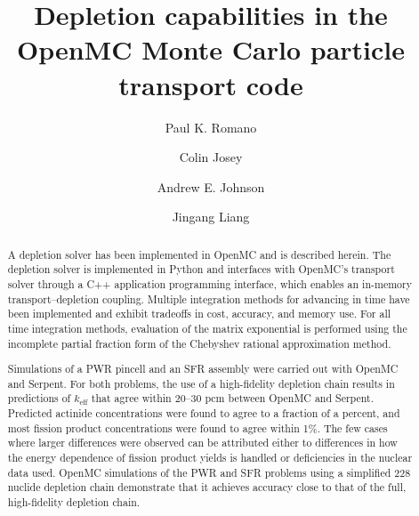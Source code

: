 \documentclass[3p,authoryear]{elsarticle}
\begin{document}
\title{Depletion capabilities in the OpenMC Monte Carlo particle transport code}

\author[anl]{Paul K. Romano}

\author[lanl]{Colin Josey}

\author[gatech]{Andrew E. Johnson}

\author[tsinghua]{Jingang Liang}

\address[anl]{Argonne National Laboratory, 9700 S. Cass Ave, Lemont, IL 60439, United States}
\address[lanl]{Los Alamos National Laboratory, P.O. Box 1663, Los Alamos, NM 87545, United States}
\address[gatech]{Georgia Institute of Technology, 770 State St NW, Atlanta, GA 30318, United States}
\address[tsinghua]{Institute of Nuclear and New Energy Technology, Tsinghua University, Beijing, China}

\begin{abstract}
  A depletion solver has been implemented in OpenMC and is described herein. The
  depletion solver is implemented in Python and interfaces with OpenMC's
  transport solver through a C++ application programming interface, which
  enables an in-memory transport--depletion coupling. Multiple integration
  methods for advancing in time have been implemented and exhibit tradeoffs in
  cost, accuracy, and memory use. For all time integration methods, evaluation
  of the matrix exponential is performed using the incomplete partial fraction
  form of the Chebyshev rational approximation method.

  Simulations of a PWR pincell and an SFR assembly were carried out with OpenMC
  and Serpent. For both problems, the use of a high-fidelity depletion chain
  results in predictions of $k_\text{eff}$ that agree within 20--30 pcm between
  OpenMC and Serpent. Predicted actinide concentrations were found to agree to a
  fraction of a percent, and most fission product concentrations were found to
  agree within 1\%. The few cases where larger differences were observed can be
  attributed either to differences in how the energy dependence of fission
  product yields is handled or deficiencies in the nuclear data used. OpenMC
  simulations of the PWR and SFR problems using a simplified 228 nuclide
  depletion chain demonstrate that it achieves accuracy close to that of the
  full, high-fidelity depletion chain.
\end{abstract}
\end{document}
